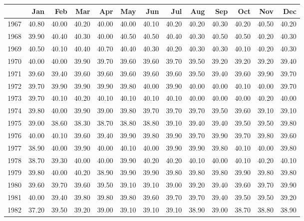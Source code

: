 \begin{longtable}{rrrrrrrrrrrrr}
  \hline
 & Jan & Feb & Mar & Apr & May & Jun & Jul & Aug & Sep & Oct & Nov & Dec \\ 
  \hline
1967 & 40.80 & 40.00 & 40.20 & 40.00 & 40.00 & 40.10 & 40.20 & 40.20 & 40.30 & 40.20 & 40.50 & 40.20 \\ 
  1968 & 39.90 & 40.40 & 40.30 & 40.00 & 40.50 & 40.50 & 40.40 & 40.30 & 40.50 & 40.50 & 40.20 & 40.30 \\ 
  1969 & 40.50 & 40.10 & 40.40 & 40.70 & 40.40 & 40.30 & 40.20 & 40.30 & 40.30 & 40.10 & 40.20 & 40.30 \\ 
  1970 & 40.00 & 40.00 & 39.90 & 39.70 & 39.60 & 39.60 & 39.70 & 39.50 & 39.20 & 39.20 & 39.20 & 39.40 \\ 
  1971 & 39.60 & 39.40 & 39.60 & 39.60 & 39.60 & 39.60 & 39.60 & 39.50 & 39.40 & 39.60 & 39.90 & 39.70 \\ 
  1972 & 39.70 & 39.90 & 39.90 & 39.90 & 39.80 & 40.00 & 39.90 & 40.00 & 40.00 & 40.10 & 40.00 & 39.70 \\ 
  1973 & 39.70 & 40.10 & 40.20 & 40.10 & 40.10 & 40.10 & 40.10 & 40.00 & 40.00 & 40.00 & 40.20 & 40.00 \\ 
  1974 & 39.80 & 40.00 & 39.90 & 39.00 & 39.80 & 39.70 & 39.70 & 39.70 & 39.50 & 39.60 & 39.10 & 39.10 \\ 
  1975 & 39.00 & 38.60 & 38.30 & 38.70 & 38.80 & 38.80 & 39.10 & 39.40 & 39.40 & 39.50 & 39.50 & 39.80 \\ 
  1976 & 40.00 & 40.10 & 39.60 & 39.40 & 39.90 & 39.80 & 39.90 & 39.70 & 39.90 & 39.70 & 39.80 & 39.60 \\ 
  1977 & 38.90 & 40.00 & 39.90 & 40.00 & 40.10 & 40.00 & 39.90 & 39.90 & 39.80 & 40.10 & 40.00 & 39.80 \\ 
  1978 & 38.70 & 39.30 & 40.00 & 40.00 & 39.90 & 40.20 & 40.20 & 40.10 & 40.00 & 40.10 & 40.20 & 40.10 \\ 
  1979 & 39.80 & 40.00 & 40.20 & 38.90 & 39.90 & 39.90 & 39.80 & 39.80 & 39.80 & 39.90 & 39.80 & 39.80 \\ 
  1980 & 39.60 & 39.70 & 39.60 & 39.50 & 39.10 & 39.10 & 39.00 & 39.20 & 39.40 & 39.60 & 39.70 & 39.90 \\ 
  1981 & 40.00 & 39.40 & 39.80 & 39.80 & 39.80 & 39.60 & 39.70 & 39.70 & 39.40 & 39.50 & 39.50 & 39.20 \\ 
  1982 & 37.20 & 39.50 & 39.20 & 39.00 & 39.10 & 39.10 & 39.10 & 38.90 & 39.00 & 38.70 & 38.80 & 38.90 \\ 

\end{longtable}
